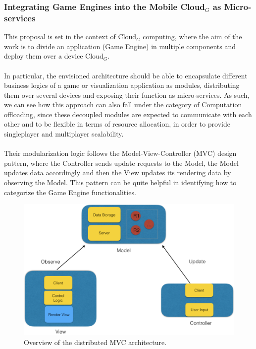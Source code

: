 \subsubsection{Integrating Game Engines into the Mobile Cloud$_G$ as Micro-services \cite{womak:game-engines-cloud-microservices}}\label{distribution-MVC}
This proposal is set in the context of Cloud$_G$ computing, where the aim of the work is to divide an application (Game Engine) in multiple components and deploy them over a device Cloud$_G$. \\ \\
In particular, the envisioned architecture should be able to encapsulate different business logics of a game or visualization application as modules, distributing them over several devices and exposing their function as micro-services. As such, we can see how this approach can also fall under the category of Computation offloading, since these decoupled modules are expected to communicate with each other and to be flexible in terms of resource allocation, in order to provide singleplayer and multiplayer scalability. \\ \\
Their modularization logic follows the Model-View-Controller (MVC) design pattern, where the Controller sends update requests to the Model, the Model updates data accordingly and then the View updates its rendering data by observing the Model. This pattern can be quite helpful in identifying how to categorize the Game Engine functionalities.
\begin{figure}[h!]
	\centering
	\includegraphics[width=0.9\linewidth]{"immagini/State-of-the-art/MVC distributed architecture"}
	\caption[Overview of the distributed MVC architecture]{Overview of the distributed MVC architecture.}
	\label{fig:mvc-distributed-architecture}
\end{figure}
